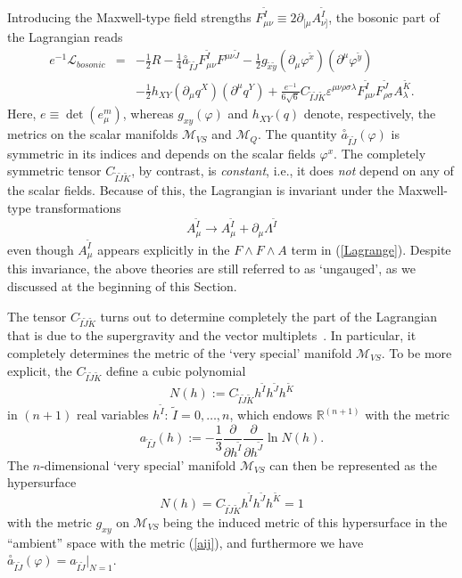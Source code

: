 \documentclass[a4paper,11pt]{article}
\newcommand{\ti}{\ensuremath{\tilde{I}}}
\newcommand{\tj}{\ensuremath{\tilde{J}}}
\newcommand{\tk}{\ensuremath{\tilde{K}}}
\newcommand{\M}{\ensuremath{\mathcal{M}}}
\begin{document}
Introducing the Maxwell-type field strengths
$F_{\mu\nu}^{\tilde{I}}\equiv 2
\partial_{[\mu}A_{\nu]}^{\tilde{I}}$, the bosonic part of the Lagrangian 
reads~\cite{GST1,Sier}
\begin{eqnarray}\label{Lagrange}
e^{-1}\mathcal{L}_{bosonic}&=&-\frac{1}{2}R- \frac{1}{4}
{\stackrel{\circ}{a}}_{\tilde{I}\tilde{J}}
F_{\mu\nu}^{\tilde{I}}F^{\mu\nu\tilde{J}}-     \frac{1}{2}
g_{\tilde{x}\tilde{y}}(\partial_{\mu}\varphi^{\tilde{x}})(\partial^{\mu}
\varphi^{\tilde{y}})\nonumber\\
&&-\frac{1}{2} h_{XY}(\partial_{\mu}q^{X})(\partial^{\mu} q^{Y})
+\frac{e^{-1}}{6\sqrt{6}}C_{\tilde{I}\tilde{J}\tilde{K}}
\varepsilon^{\mu\nu\rho\sigma\lambda}F_{\mu\nu}^{\tilde{I}}
F_{\rho\sigma}^{\tilde{J}}A_{\lambda}^{\tilde{K}}.
\end{eqnarray}
Here, $e\equiv \det(e_{\mu}^{m})$, whereas $g_{xy} (\varphi)$ and $h_{XY}(q)$ denote, 
respectively, the  metrics on the scalar manifolds $\mathcal{M}_{VS}$ and 
$\mathcal{M}_Q$. The quantity ${\stackrel{\circ}{a}}_{\tilde{I}\tilde{J}}(\varphi)$ is 
symmetric in its indices and depends on the scalar fields $\varphi^{x}$. The completely 
symmetric tensor $C_{\tilde{I}\tilde{J}\tilde{K}}$, by contrast, is \emph{constant}, 
i.e., it does \emph{not} depend on any of the scalar fields. Because of this, the 
Lagrangian is invariant under the Maxwell-type transformations
\begin{equation}\label{Maxwell2}
A_{\mu}^{\tilde{I}}\longrightarrow A_{\mu}^{\tilde{I}} +
\partial_{\mu} \Lambda^{\tilde{I}}
\end{equation}
even though $A^{\tilde{I}}_{\mu}$ appears explicitly in the $F\wedge F
\wedge A $ term in (\ref{Lagrange}). Despite this invariance, the
above theories are still referred to as `ungauged', as we
discussed at the beginning of this Section.


The tensor $C_{\ti\tj\tk}$ turns out to determine completely the
part of the Lagrangian that is due to the supergravity and the
vector multiplets~\cite{GST1}. In particular, it completely
determines the metric of the `very special' manifold $\M_{VS}$.
To be more explicit, the $C_{\ti\tj\tk}$ define a cubic polynomial
\begin{equation}
N(h):=C_{\ti\tj\tk}h^{\ti}h^{\tj}h^{\tk}
\end{equation}
in $(n+1)$ real variables $h^{\ti}$: $\ti=0,\ldots, n$, which
endows ${\mathbb{R}}^{(n+1)}$ with the  metric
\begin{equation}\label{aij}
a_{\tilde{I}\tilde{J}}(h):=-\frac{1}{3}\frac{\partial}{\partial
h^{\tilde{I}}} \frac{\partial}{\partial h^{\tilde{J}}} \ln N(h).
\end{equation}
The $n$-dimensional `very special' manifold $\M_{VS}$ can then be
represented as the hypersurface~\cite{GST1}
\begin{equation}
N(h)=C_{\ti\tj\tk}h^{\ti}h^{\tj}h^{\tk}=1
\end{equation}
with the metric $g_{xy}$ on $\M_{VS}$ being the induced metric of this hypersurface in 
the ``ambient'' space with the metric (\ref{aij}), and furthermore we have
${\stackrel{\circ}{a}}_{\ti\tj}(\varphi)=a_{\ti\tj}|_{N=1}$.
\end{document}
